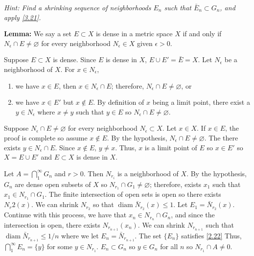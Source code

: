 \begin{exercise}
  \textit{Hint: Find a shrinking sequence of neighborhoods \(E_n\) such that
    \(\bar{E}_n\subset G_n\), and apply \cref{3.21}.}
  \par\smallskip
  \textbf{Lemma:} We say a set \(E\subset X\) is dense in a metric space
  \(X\) if and only if \(N_{\epsilon}\cap E\neq\varnothing\) for every
  neighborhood \(N_{\epsilon}\in X\) given \(\epsilon > 0\).
  \par\smallskip
  Suppose \(E\subset X\) is dense.
  Since \(E\) is dense in \(X\), \(E\cup E' = \bar{E} = X\).
  Let \(N_{\epsilon}\) be a neighborhood of \(X\).
  For \(x\in N_{\epsilon}\),
  \begin{enumerate}[label = \roman*.]
  \item
    we have \(x\in E\), then \(x\in N_{\epsilon}\cap E\); therefore,
    \(N_{\epsilon}\cap E\neq\varnothing\), or
  \item
    we have \(x\in E'\) but \(x\not\in E\).
    By definition of \(x\) being a limit point, there exist a
    \(y\in N_{\epsilon}\) where \(x\neq y\) such that \(y\in E\) so
    \(N_{\epsilon}\cap E\neq\varnothing\).
  \end{enumerate}
  Suppose \(N_{\epsilon}\cap E\neq\varnothing\) for every neighborhood
  \(N_{\epsilon}\subset X\).
  Let \(x\in X\).
  If \(x\in E\), the proof is complete so assume \(x\not\in E\).
  By the hypothesis, \(N_{\epsilon}\cap E\neq\varnothing\).
  The there exists \(y\in N_{\epsilon}\cap E\).
  Since \(x\not\in E\), \(y\neq x\).
  Thus, \(x\) is a limit point of \(E\) so \(x\in E'\) so \(X = E\cup E'\) and
  \(E\subset X\) is dense in \(X\).
  \par\smallskip
  Let \(A = \bigcap_1^{\infty}G_n\) and \(r > 0\).
  Then \(N_{r_i}\) is a neighborhood of \(X\).
  By the hypothesis, \(G_n\) are dense open subsets of \(X\) so
  \(N_{r_1}\cap G_1\neq\varnothing\); therefore, exists \(x_1\) such that
  \(x_1\in N_{r_1}\cap G_1\).
  The finite intersection of open sets is open so there exists \(N_r{2}(x)\).
  We can shrink \(N_{r_2}\) so that
  \(\operatorname{diam}\bar{N}_{r_2}(x)\leq 1\).
  Let \(E_1 = \bar{N}_{r_2}(x)\).
  Continue with this process, we have that \(x_n\in N_{r_n}\cap G_n\), and
  since the intersection is open, there exists \(N_{r_{n + 1}}(x_n)\).
  We can shrink \(N_{r_{n + 1}}\) such that
  \(\operatorname{diam}\bar{N}_{r_{n + 1}}\leq 1/n\) where we let
  \(E_n = \bar{N}_{r_{n + 1}}\).
  The set \(\{E_n\}\) satisfies \cref{2.22}
  Thus, \(\bigcap_1^{\infty}E_n = \{y\}\) for some \(y\in N_{r_1}\).
  \(E_n\subset G_n\) so \(y\in G_n\) for all \(n\) so \(N_{r_1}\cap A\neq 0\).

\end{exercise}
